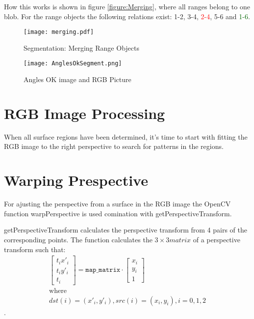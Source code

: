How this works is shown in figure \vref{figure:Merging}, where all ranges belong to one blob. For the range objects
the following relations exist: 1-2, 3-4, \textcolor{red}{2-4}, 5-6 and \textcolor{darkgreen}{1-6}.

\begin{figure}[H]
\begin{center}
  \texttt{[image: merging.pdf]}
  \caption{Segmentation: Merging Range Objects}
  \label{figure:Merging}
\end{center}
\end{figure}
 



\begin{figure}[H]
\begin{center}
  \texttt{[image: AnglesOkSegment.png]}
  \caption[Angles OK Image and RGB Picture]{Angles OK image and RGB Picture\footnotemark}
  \label{figure:AnglesOKSeg}
\end{center}
\end{figure}
\newpage

\section{RGB Image Processing}

When all surface regions have been determined, it's time to start with fitting the RGB image 
to the right perspective to search for patterns in the regions. 


\section{Warping Prespective}
For ajusting the perspective from a surface in the RGB image the OpenCV function warpPerspective
 is used comination with getPerspectiveTransform.

getPerspectiveTransform calculates the perspective transform from 4 pairs of the corresponding points.
The function calculates the $3 \times 3 matrix$ of a perspective transform such that:
\begin{gather}
\begin{bmatrix} t_i x'_i \\ t_i y'_i \\ t_i \end{bmatrix} = \texttt{map\_matrix} \cdot \begin{bmatrix} x_i \\ y_i \\ 1 \end{bmatrix} 
\nonumber\\\mbox{where}\nonumber\\dst(i)=(x'_i,y'_i), src(i)=(x_i, y_i), i=0,1,2 
\end{gather}
\cite{willowgarage:opencv:getPerspectiveTransform}.

